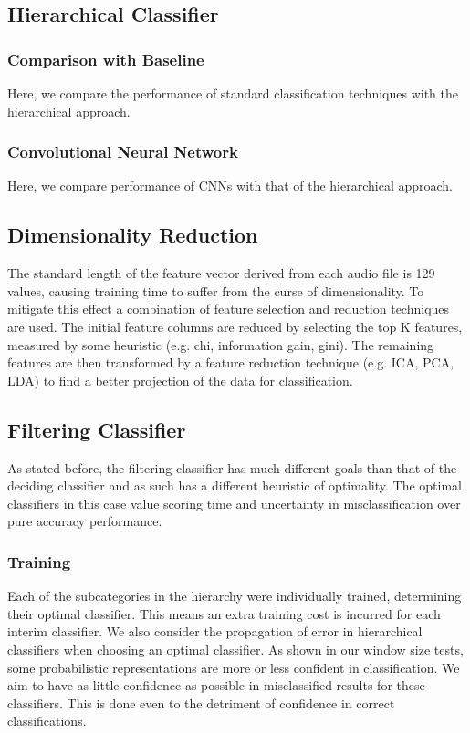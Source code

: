 \subsection{Hierarchical Classifier}

\subsubsection{Comparison with Baseline}
Here, we compare the performance of standard classification techniques with the hierarchical approach.

\subsubsection{Convolutional Neural Network}
Here, we compare performance of CNNs with that of the hierarchical approach.


\subsection{Dimensionality Reduction}
The standard length of the feature vector derived from each audio file is 129 values, causing training time to suffer from the curse of dimensionality. To mitigate this effect a combination of feature selection and reduction techniques are used. The initial feature columns are reduced by selecting the top K features, measured by some heuristic (e.g. chi, information gain, gini). The remaining features are then transformed by a feature reduction technique (e.g. ICA, PCA, LDA) to find a better projection of the data for classification.

\subsection{Filtering Classifier}
As stated before, the filtering classifier has much different goals than that of the deciding classifier and as such has a different heuristic of optimality. The optimal classifiers in this case value scoring time and uncertainty in misclassification over pure accuracy performance.

\subsubsection{Training}
Each of the subcategories in the hierarchy were individually trained, determining their optimal classifier. This means an extra training cost is incurred for each interim classifier. We also consider the propagation of error in hierarchical classifiers when choosing an optimal classifier. As shown in our window size tests, some probabilistic representations are more or less confident in classification. We aim to have as little confidence as possible in misclassified results for these classifiers. This is done even to the detriment of confidence in correct classifications.

